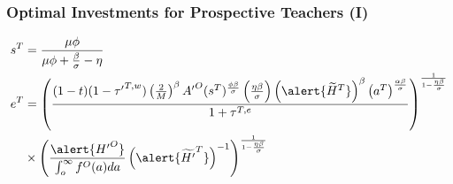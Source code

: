 \documentclass[11pt]{beamer}
\begin{document}
\begin{frame}
\frametitle{Optimal Investments for Prospective Teachers (I)} 
\begin{align}
s^{T} & = \frac{\mu \phi}{\mu \phi+\frac{\beta}{\sigma}-\eta} \nonumber\\
e^{T} & = \left( \frac{(1-t)(1-{\tau'}^{T,w})\left(\tfrac{2}{M}\right)^\beta {A'}^O (s^{T})^\frac{\phi \beta}{\sigma} \left(\tfrac{\eta \beta}{\sigma}\right) \left(\alert{\widetilde{H}^T}\right)^\beta \left(a^{T}\right)^\frac{\alpha \beta}{\sigma}}{1+\tau^{T,e}} \right)^\frac{1}{1-\frac{\eta\beta}{\sigma}} \nonumber\\
& \times \left(\frac{\alert{{H'}^O}}{\int_o^\infty f^O(a) da}\left(\alert{\widetilde{H'}^{T}}\right)^{-1}\right)^\frac{1}{1-\frac{\eta\beta}{\sigma}} \nonumber
\end{align}
\end{frame}
\end{document}
